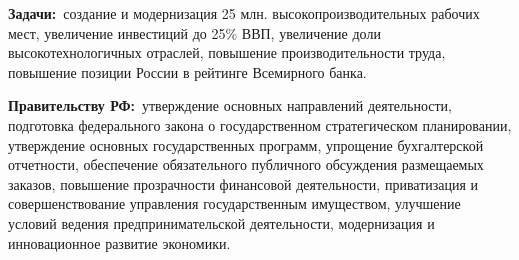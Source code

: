 \documentclass[a4paper, fontsize=10bp]{article} %
\begin{document}
    {\bfseries Задачи:}\ создание и модернизация 25 млн. высокопроизводительных рабочих мест, увеличение инвестиций до 25\% ВВП, увеличение доли высокотехнологичных отраслей, повышение производительности труда, повышение позиции России в рейтинге Всемирного банка.

    {\bfseries Правительству РФ:}\ утверждение основных направлений деятельности, подготовка федерального закона о государственном стратегическом планировании, утверждение основных государственных программ, упрощение бухгалтерской отчетности, обеспечение обязательного публичного обсуждения размещаемых заказов, повышение прозрачности финансовой деятельности, приватизация и совершенствование управления государственным имуществом, улучшение условий ведения предпринимательской деятельности, модернизация и инновационное развитие экономики.
\end{document}
